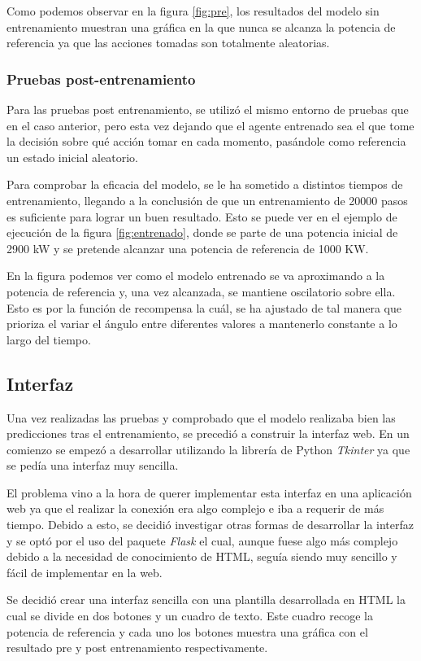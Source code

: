 Como podemos observar en la figura \ref{fig:pre}, los resultados del modelo sin entrenamiento muestran una gráfica en la que nunca se alcanza la potencia de referencia ya que las acciones tomadas son totalmente aleatorias.

\subsubsection{Pruebas post-entrenamiento}

Para las pruebas post entrenamiento, se utilizó el mismo entorno de pruebas que en el caso anterior, pero esta vez dejando que el agente entrenado sea el que tome la decisión sobre qué acción tomar en cada momento, pasándole como referencia un estado inicial aleatorio.

\label{fig:entrenado}

Para comprobar la eficacia del modelo, se le ha sometido a distintos tiempos de entrenamiento, llegando a la conclusión de que un entrenamiento de 20000 pasos es suficiente para lograr un buen resultado. Esto se puede ver en el ejemplo de ejecución de la figura \ref{fig:entrenado}, donde se parte de una potencia inicial de 2900 kW y se pretende alcanzar una potencia de referencia de 1000 KW.

En la figura podemos ver como el modelo entrenado se va aproximando a la potencia de referencia y, una vez alcanzada, se mantiene oscilatorio sobre ella. Esto es por la función de recompensa la cuál, se ha ajustado de tal manera que prioriza el variar el ángulo entre diferentes valores a mantenerlo constante a lo largo del tiempo.

\subsection{Interfaz}

Una vez realizadas las pruebas y comprobado que el modelo realizaba bien las predicciones tras el entrenamiento, se precedió a construir la interfaz web.
En un comienzo se empezó a desarrollar utilizando la librería de Python \textit{Tkinter} ya que se pedía una interfaz muy sencilla.

El problema vino a la hora de querer implementar esta interfaz en una aplicación web ya que el realizar la conexión era algo complejo e iba a requerir de más tiempo. Debido a esto, se decidió investigar otras formas de desarrollar la interfaz y se optó por el uso del paquete \textit{Flask} el cual, aunque fuese algo más complejo debido a la necesidad de conocimiento de HTML, seguía siendo muy sencillo y fácil de implementar en la web.

Se decidió crear una interfaz sencilla con una plantilla desarrollada en HTML la cual se divide en dos botones y un cuadro de texto. Este cuadro recoge la potencia de referencia y cada uno los botones muestra una gráfica con el resultado pre y post entrenamiento respectivamente.